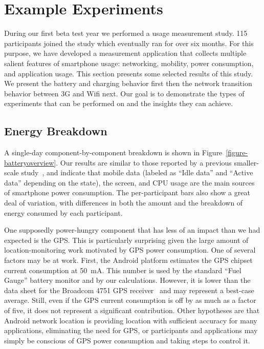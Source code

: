 \section{Example Experiments}
\label{sec-experiments}

During our first beta test year we performed a usage measurement study. 115
participants joined the study which eventually ran for over six months. For
this purpose, we have developed a measurement application that collects
multiple salient features of smartphone usage: networking, mobility, power
consumption, and application usage. This section presents some selected
results of this study. We present the battery and charging behavior first
then the network transition behavior between 3G and Wifi next. Our goal is to
demonstrate the types of experiments that can be performed on \PhoneLab{} and
the insights they can achieve.

\subsection{Energy Breakdown}
\label{subsec-energybreakdown}

A single-day component-by-component breakdown is shown in
Figure~\ref{figure-batteryoverview}. Our results are similar to those reported
by a previous smaller-scale study~\cite{shye:micro:2009}, and indicate that
mobile data (labeled as ``Idle data'' and ``Active data'' depending on the
state), the screen, and CPU usage are the main sources of smartphone power
consumption. The per-participant bars also show a great deal of variation, with
differences in both the amount and the breakdown of energy consumed by each
participant.

One supposedly power-hungry component that has less of an impact than we had
expected is the GPS. This is particularly surprising given the large amount
of location-monitoring work motivated by GPS power consumption. One of
several factors may be at work. First, the Android platform estimates the GPS
chipset current consumption at 50~mA. This number is used by the standard
``Fuel Gauge'' battery monitor and by our calculations. However, it is lower
than the data sheet for the Broadcom 4751 GPS receiver~\cite{bcm4751} and may
represent a best-case average. Still, even if the GPS current consumption is
off by as much as a factor of five, it does not represent a significant
contribution. Other hypotheses are that Android network location is providing
location with sufficient accuracy for many applications, eliminating the need
for GPS, or participants and applications may simply be conscious of GPS
power consumption and taking steps to control it.


